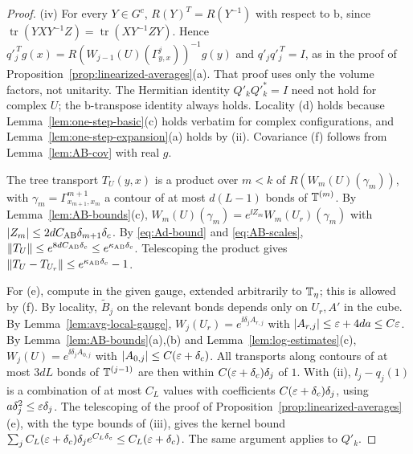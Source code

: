 \begin{proof}
(iv) For every $Y\in G^c$, $R(Y)^T=R(Y^{-1})$ with respect to $\mathrm b$, since $\operatorname{tr}(YXY^{-1}Z)=\operatorname{tr}(XY^{-1}ZY)$. Hence $q'^{\,T}_jg(x)=R(W_{j-1}(U)(\Gamma^j_{y,x}))^{-1}g(y)$ and $q'_jq'^{\,T}_j=I$, as in the proof of Proposition~\ref{prop:linearized-averages}(a). That proof uses only the volume factors, not unitarity. The Hermitian identity $Q'_kQ'^*_k=I$ need not hold for complex $U$; the $\mathrm b$-transpose identity always holds. Locality (d) holds because Lemma~\ref{lem:one-step-basic}(c) holds verbatim for complex configurations, and Lemma~\ref{lem:one-step-expansion}(a) holds by (ii). Covariance (f) follows from Lemma~\ref{lem:AB-cov} with real $g$.

The tree transport $T_U(y,x)$ is a product over $m<k$ of $R(W_m(U)(\gamma_m))$, with $\gamma_m=\Gamma^{m+1}_{x_{m+1},x_m}$ a contour of at most $d(L-1)$ bonds of $\mathbb T^{(m)}$. By Lemma~\ref{lem:AB-bounds}(c), $W_m(U)(\gamma_m)=e^{\ii Z_m}W_m(U_r)(\gamma_m)$ with $|Z_m|\le2dC_{\rm AB}\delta_{m+1}\delta_c$. By \eqref{eq:Ad-bound} and \eqref{eq:AB-scales}, $\|T_U\|\le e^{8dC_{\rm AB}\delta_c}\le e^{\kappa_{\rm AB}\delta_c}$. Telescoping the product gives $\|T_U-T_{U_r}\|\le e^{\kappa_{\rm AB}\delta_c}-1$.

For (e), compute in the given gauge, extended arbitrarily to $\mathbb T_\eta$; this is allowed by (f). By locality, $\tilde B_j$ on the relevant bonds depends only on $U_r,A'$ in the cube. By Lemma~\ref{lem:avg-local-gauge}, $W_j(U_r)=e^{\ii\delta_jA_{r,j}}$ with $|A_{r,j}|\le\varepsilon+4da\le C\varepsilon$. By Lemma~\ref{lem:AB-bounds}(a),(b) and Lemma~\ref{lem:log-estimates}(c), $W_j(U)=e^{\ii\delta_jA_{0,j}}$ with $|A_{0,j}|\le C(\varepsilon+\delta_c)$. All transports along contours of at most $3dL$ bonds of $\mathbb T^{(j-1)}$ are then within $C(\varepsilon+\delta_c)\delta_j$ of $1$. With (ii), $l_j-q_j(1)$ is a combination of at most $C_L$ values with coefficients $C(\varepsilon+\delta_c)\delta_j$, using $a\delta_j^2\le\varepsilon\delta_j$. The telescoping of the proof of Proposition~\ref{prop:linearized-averages}(e), with the type bounds of (iii), gives the kernel bound $\sum_jC_L(\varepsilon+\delta_c)\delta_je^{C_L\delta_c}\le C_L(\varepsilon+\delta_c)$. The same argument applies to $Q'_k$.


\end{proof}
